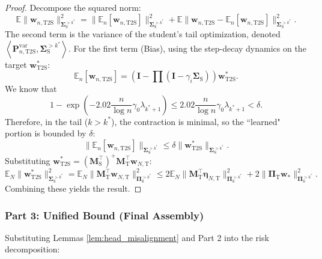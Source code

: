 \documentclass{article}
\theoremstyle{definition}
\theoremstyle{definition}
\theoremstyle{plain}
\theoremstyle{plain}
\theoremstyle{plain}
\theoremstyle{plain}
\theoremstyle{plain}
\newcommand{\bs}[1]{\boldsymbol{\mathbf{#1}}}
\newcommand{\Ex}{\mathbb{E}}
\newcommand{\te}{\mathrm{T}}
\newcommand{\st}{\mathrm{S}}
\newcommand{\ts}{\mathrm{T2S}}
\newcommand{\M}{\mathbf{M}}
\newcommand{\Sig}{\mathbf{\Sigma}}
\newcommand{\w}{\mathbf{w}}
\newcommand{\id}{\mathbf{I}}
\newcommand{\inner}[1]{\left\langle#1\right\rangle}
\begin{document}
\begin{proof}
    Decompose the squared norm:
    \begin{equation}
        \Ex \|\w_{n,\ts}\|_{\Sig_\st^{> k^*}}^2 = \|\Ex_n[\w_{n,\ts}]\|_{\Sig_\st^{> k^*}}^2 + \Ex \|\w_{n,\ts} - \Ex_n[\w_{n,\ts}]\|_{\Sig_\st^{> k^*}}^2.
    \end{equation}
    The second term is the variance of the student's tail optimization, denoted $\inner{\bs P^{\mathrm{var}}_{n,\ts}, \Sig_\st^{> k^*}}$.
    For the first term (Bias), using the step-decay dynamics on the target $\w^*_\ts$:
    \begin{equation}
        \Ex_n[\w_{n,\ts}] = (\id - \prod (\id - \gamma_i \bs \Sigma_\st)) \w^*_\ts.
    \end{equation}
    We know that
    \begin{equation}
        1-\exp\left(-2.02\frac{n}{\log n}\gamma_0\lambda_{k^*+1}\right)\leq2.02\frac{n}{\log n}\gamma_0\lambda_{k^*+1}<\delta.
    \end{equation}
    Therefore, in the tail ($k > k^*$), the contraction is minimal, so the ``learned" portion is bounded by $\delta$:
    \begin{equation}
        \|\Ex_n[\w_{n,\ts}]\|_{\Sig_\st^{> k^*}} \leq \delta \|\w^*_\ts\|_{\Sig_\st^{> k^*}}.
    \end{equation}
    Substituting $\w^*_\ts = (\M_\st^\top)^+ \M_\te^\top \w_{N,\te}$:
    \begin{equation}
        \Ex_N \|\w^*_\ts\|_{\Sig_\st^{> k^*}}^2 = \Ex_N \|\M_\te^\top \w_{N,\te}\|_{\bs \Pi_\st^{> k^*}}^2 \leq 2 \Ex_N \|\M_\te^\top \bs\eta_{N,\te}\|_{\bs \Pi_\st^{> k^*}}^2 + 2 \|\bs \Pi_\te \w_*\|_{\bs \Pi_\st^{> k^*}}^2.
    \end{equation}
    Combining these yields the result.

    
\end{proof}

\subsubsection*{Part 3: Unified Bound (Final Assembly)}

Substituting Lemmas \ref{lem:head_misalignment} and Part 2 into the risk decomposition:
\end{document}
